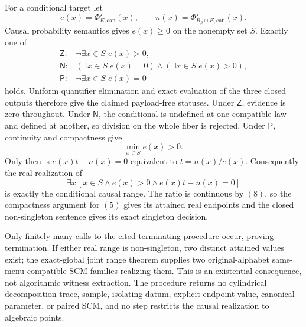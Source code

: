 For a conditional target let
\[
e(x)=\Phi_{E,\mathrm{can}}^\star(x),
\qquad
n(x)=\Phi_{B_\rho\cap E,\mathrm{can}}^\star(x).
\tag{6}
\]
Causal probability semantics gives \(e(x)\geq0\) on the nonempty set \(S\).  Exactly one of
\[
\begin{array}{ll}
\mathsf Z:&\neg\exists x\in S\;e(x)>0,\\
\mathsf N:&(\exists x\in S\;e(x)=0)\wedge(\exists x\in S\;e(x)>0),\\
\mathsf P:&\neg\exists x\in S\;e(x)=0
\end{array}
\tag{7}
\]
holds.  Uniform quantifier elimination and exact evaluation of the three closed outputs therefore give the claimed payload-free statuses.  Under \(\mathsf Z\), evidence is zero throughout.  Under \(\mathsf N\), the conditional is undefined at one compatible law and defined at another, so division on the whole fiber is rejected.  Under \(\mathsf P\), continuity and compactness give
\[
\min_{x\in S}e(x)>0.
\tag{8}
\]
Only then is \(e(x)t-n(x)=0\) equivalent to \(t=n(x)/e(x)\).  Consequently the real realization of
\[
\exists x\,[x\in S\wedge e(x)>0\wedge e(x)t-n(x)=0]
\tag{9}
\]
is exactly the conditional causal range.  The ratio is continuous by \((8)\), so the compactness argument for \((5)\) gives its attained real endpoints and the closed non-singleton sentence gives its exact singleton decision.

Only finitely many calls to the cited terminating procedure occur, proving termination.  If either real range is non-singleton, two distinct attained values exist; the exact-global joint range theorem supplies two original-alphabet same-menu compatible SCM families realizing them.  This is an existential consequence, not algorithmic witness extraction.  The procedure returns no cylindrical decomposition trace, sample, isolating datum, explicit endpoint value, canonical parameter, or paired SCM, and no step restricts the causal realization to algebraic points.